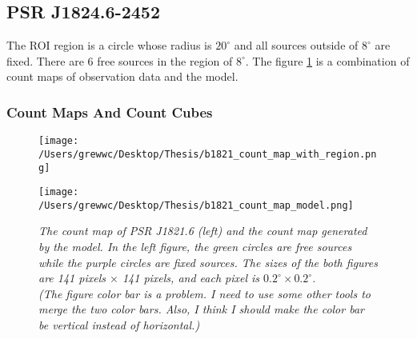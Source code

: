\documentclass[12pt]{report}
\newcommand{\mycaption}[1]{\caption{\textit{\footnotesize #1}}}
\begin{document}
            
            \subsection{PSR J1824.6-2452}
              The ROI region is a circle whose radius is $20^\circ$ and all sources outside of $8^\circ$ are fixed. 
              There are 6 free sources in the region of $8^\circ$. The figure 
              \ref{fig: b1821_count_map_with_region_and_model} 
              is a combination of count maps of observation data and the model. 

              \subsubsection{Count Maps And Count Cubes}
              \begin{figure}[!ht]
                \begin{center}
                \begin{minipage}{0.45\textwidth}
                  \begin{center} 
                    \texttt{[image: /Users/grewwc/Desktop/Thesis/b1821\_count\_map\_with\_region.png]}
                  \end{center}
                \end{minipage}
                \begin{minipage}{0.45\textwidth}
                  \begin{center}
                    \texttt{[image: /Users/grewwc/Desktop/Thesis/b1821\_count\_map\_model.png]}
                  \end{center}
                \end{minipage}
              \end{center}

                \centering
                \begin{minipage}{\textwidth}
                  \mycaption{The count map of PSR J1821.6 (left) and the count map generated by the model. In the left figure,
                  the green circles are free sources while the purple circles are fixed sources.
                  The sizes of the both figures are 141 pixels $\times$ 141 pixels, 
                  and each pixel is $0.2^\circ \times 0.2^\circ$. 
                  \\ (The figure color bar is a problem. I need to use some other tools to merge the two color bars. 
                  Also, I think I should make the color bar be vertical instead of horizontal.)}
                  \label{fig: b1821_count_map_with_region_and_model}
                \end{minipage}
              \end{figure}
              
\end{document}
